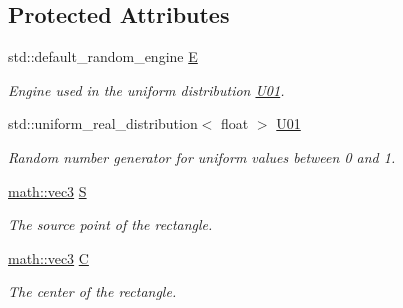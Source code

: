 \subsection*{Protected Attributes}
\begin{DoxyCompactItemize}
\item 
\mbox{\label{classphysim_1_1init_1_1rect__source_abd010c853eefe15fcbb719e30856884a}} 
std\+::default\+\_\+random\+\_\+engine \hyperlink{classphysim_1_1init_1_1rect__source_abd010c853eefe15fcbb719e30856884a}{E}
\begin{DoxyCompactList}\small\item\em Engine used in the uniform distribution \hyperlink{classphysim_1_1init_1_1rect__source_af45d00e6991106d11b3c8fd1e87e18ec}{U01}. \end{DoxyCompactList}\item 
\mbox{\label{classphysim_1_1init_1_1rect__source_af45d00e6991106d11b3c8fd1e87e18ec}} 
std\+::uniform\+\_\+real\+\_\+distribution$<$ float $>$ \hyperlink{classphysim_1_1init_1_1rect__source_af45d00e6991106d11b3c8fd1e87e18ec}{U01}
\begin{DoxyCompactList}\small\item\em Random number generator for uniform values between 0 and 1. \end{DoxyCompactList}\item 
\mbox{\label{classphysim_1_1init_1_1rect__source_ab12449975c6df03027ff17b424fb151b}} 
\hyperlink{structphysim_1_1math_1_1vec3}{math\+::vec3} \hyperlink{classphysim_1_1init_1_1rect__source_ab12449975c6df03027ff17b424fb151b}{S}
\begin{DoxyCompactList}\small\item\em The source point of the rectangle. \end{DoxyCompactList}\item 
\mbox{\label{classphysim_1_1init_1_1rect__source_a3308db7d0c3629fcfd43e6a6f06aa406}} 
\hyperlink{structphysim_1_1math_1_1vec3}{math\+::vec3} \hyperlink{classphysim_1_1init_1_1rect__source_a3308db7d0c3629fcfd43e6a6f06aa406}{C}
\begin{DoxyCompactList}\small\item\em The center of the rectangle. \end{DoxyCompactList}\item 

\end{DoxyCompactItemize}
